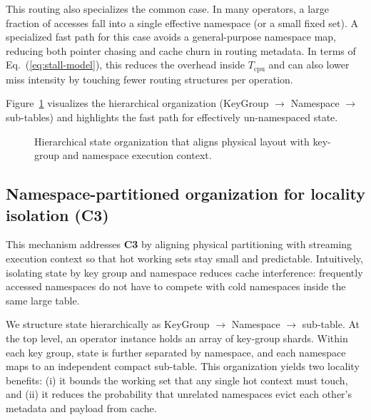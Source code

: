 \documentclass[sigconf]{acmart}
\begin{document}
This routing also specializes the common case. In many operators, a large fraction of accesses fall into a single effective namespace (or a small fixed set). A specialized fast path for this case avoids a general-purpose namespace map, reducing both pointer chasing and cache churn in routing metadata. In terms of Eq.~(\ref{eq:stall-model}), this reduces the overhead inside $T_{\mathrm{cpu}}$ and can also lower miss intensity by touching fewer routing structures per operation.

Figure~\ref{fig:kg-ns-hierarchy} visualizes the hierarchical organization (KeyGroup $\rightarrow$ Namespace $\rightarrow$ sub-tables) and highlights the fast path for effectively un-namespaced state.

\begin{figure}[t]
  \centering
  \caption{Hierarchical state organization that aligns physical layout with key-group and namespace execution context.}
  \label{fig:kg-ns-hierarchy}
\end{figure}

\subsection{Namespace-partitioned organization for locality isolation (C3)}
This mechanism addresses \textbf{C3} by aligning physical partitioning with streaming execution context so that hot working sets stay small and predictable.
Intuitively, isolating state by key group and namespace reduces cache interference: frequently accessed namespaces do not have to compete with cold namespaces inside the same large table.

We structure state hierarchically as KeyGroup $\rightarrow$ Namespace $\rightarrow$ sub-table. At the top level, an operator instance holds an array of key-group shards. Within each key group, state is further separated by namespace, and each namespace maps to an independent compact sub-table.
This organization yields two locality benefits: (i) it bounds the working set that any single hot context must touch, and (ii) it reduces the probability that unrelated namespaces evict each other's metadata and payload from cache.
\end{document}
